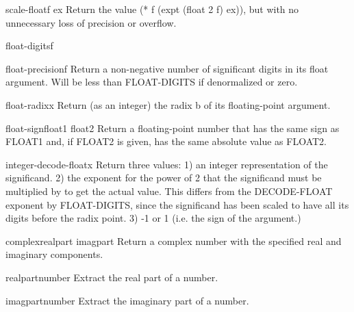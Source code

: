 \documentclass[10pt,english]{book}
\begin{document}
\begin{function}{scale-float}{f ex}
  Return the value (* f (expt (float 2 f) ex)), but with no unnecessary loss
  of precision or overflow.
\end{function}

\begin{function}{float-digits}{f}
  
\end{function}

\begin{function}{float-precision}{f}
  Return a non-negative number of significant digits in its float argument.
  Will be less than FLOAT-DIGITS if denormalized or zero.
\end{function}

\begin{function}{float-radix}{x}
  Return (as an integer) the radix b of its floating-point argument.
\end{function}

\begin{function}{float-sign}{float1 \op float2}
  Return a floating-point number that has the same sign as
   FLOAT1 and, if FLOAT2 is given, has the same absolute value
   as FLOAT2.
\end{function}

\begin{function}{integer-decode-float}{x}
  Return three values:
   1) an integer representation of the significand.
   2) the exponent for the power of 2 that the significand must be multiplied
      by to get the actual value. This differs from the DECODE-FLOAT exponent
      by FLOAT-DIGITS, since the significand has been scaled to have all its
      digits before the radix point.
   3) -1 or 1 (i.e. the sign of the argument.)
\end{function}

\begin{function}{complex}{realpart \op imagpart}
  Return a complex number with the specified real and imaginary components.
\end{function}

\begin{function}{realpart}{number}
  Extract the real part of a number.
\end{function}

\begin{function}{imagpart}{number}
  Extract the imaginary part of a number.
\end{function}
\end{document}
